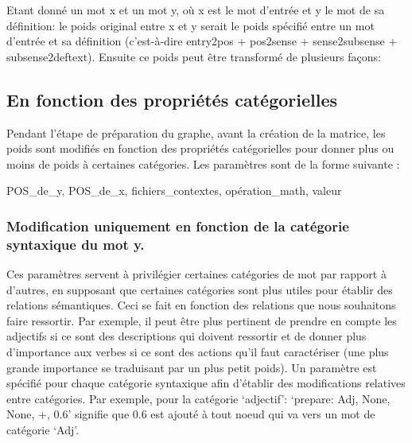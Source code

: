 Etant donné un mot x et un mot y, où x est le mot d'entrée et y le mot de sa 
définition: le poids original entre x et y serait le poids spécifié entre un mot d'entrée et 
sa définition (c'est-à-dire entry2pos + pos2sense + sense2subsense + 
subsense2deftext). Ensuite ce poids peut être transformé de plusieurs façons:

\subsection{En fonction des propriétés catégorielles}
Pendant l'étape de préparation du graphe, avant la création de la matrice, les 
poids sont modifiés en fonction des propriétés catégorielles pour donner plus 
ou moins de poids à certaines catégories. Les paramètres sont de la forme 
suivante :
    \begin{framed}
        POS\_de\_y, POS\_de\_x, fichiers\_contextes, opération\_math, valeur
    \end{framed}

\subsubsection{Modification uniquement en fonction de la catégorie 
syntaxique du mot y.}
Ces paramètres servent à privilégier certaines catégories de mot par rapport à 
d'autres, en supposant que certaines catégories sont plus utiles pour établir 
des relations sémantiques. Ceci se fait en fonction des relations que nous souhaitons faire ressortir. Par exemple, il peut être plus pertinent de prendre en compte les adjectifs si ce sont des descriptions qui doivent ressortir et de donner plus d'importance aux verbes si ce sont des actions qu'il faut caractériser (une plus grande importance se traduisant par un plus petit poids). Un paramètre est spécifié pour 
chaque catégorie syntaxique afin d'établir des modifications relatives entre 
catégories. Par exemple, pour la catégorie \lq{adjectif}\rq: \lq{prepare: Adj, 
None, None, +, 0.6}\rq{} signifie que 0.6 est ajouté à tout noeud qui va vers un 
mot de catégorie \lq{Adj}\rq{}.

